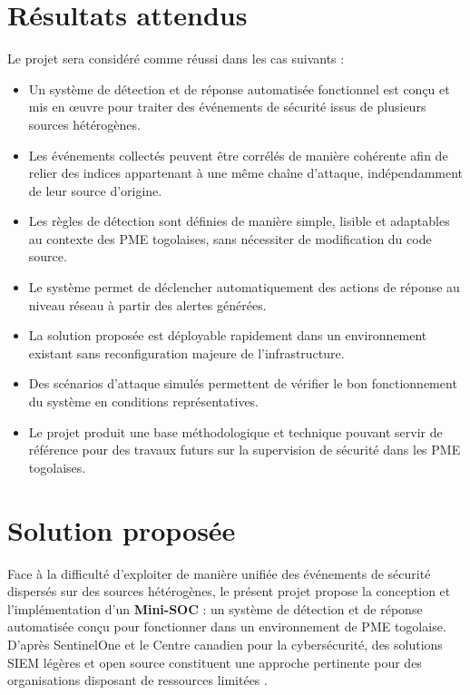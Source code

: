 \documentclass[a4paper,12pt]{article}
\begin{document}
\section{Résultats attendus}

Le projet sera considéré comme réussi dans les cas suivants :

\begin{itemize}
    \item Un système de détection et de réponse automatisée fonctionnel
    est conçu et mis en œuvre pour traiter des événements de sécurité
    issus de plusieurs sources hétérogènes.

    \item Les événements collectés peuvent être corrélés de manière
    cohérente afin de relier des indices appartenant à une même chaîne
    d'attaque, indépendamment de leur source d'origine.

    \item Les règles de détection sont définies de manière simple,
    lisible et adaptables au contexte des PME togolaises, sans nécessiter
    de modification du code source.

    \item Le système permet de déclencher automatiquement des actions de
    réponse au niveau réseau à partir des alertes générées.

    \item La solution proposée est déployable rapidement dans un
    environnement existant sans reconfiguration majeure de l'infrastructure.

    \item Des scénarios d'attaque simulés permettent de vérifier le bon
    fonctionnement du système en conditions représentatives.

    \item Le projet produit une base méthodologique et technique pouvant
    servir de référence pour des travaux futurs sur la supervision de
    sécurité dans les PME togolaises.
\end{itemize}

\section{Solution proposée}

Face à la difficulté d'exploiter de manière unifiée des événements de
sécurité dispersés sur des sources hétérogènes, le présent projet propose
la conception et l'implémentation d'un \textbf{Mini-SOC} : un système de
détection et de réponse automatisée conçu pour fonctionner dans un
environnement de PME togolaise. D'après SentinelOne et le Centre canadien
pour la cybersécurité,
des solutions SIEM légères et open source constituent une approche pertinente
pour des organisations disposant de ressources limitées
\cite{sentinelone_open_source_siem,cyber_canada_siem}.
\end{document}
